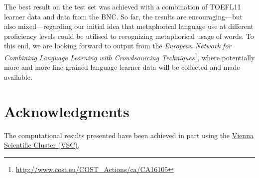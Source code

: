\documentclass[11pt,a4paper]{article}
\begin{document}
The best result on the test set was achieved with a combination of TOEFL11 learner data and data from the BNC. 
So far, the results are encouraging---but also mixed---regarding our initial idea that metaphorical language use at different proficiency levels could be utilised to recognizing metaphorical usage of words. 
To this end, we are looking forward to output from the \emph{European Network for Combining Language Learning with Crowdsourcing Techniques}\footnote{\url{http://www.cost.eu/COST_Actions/ca/CA16105}}, where potentially more and more fine-grained language learner data will be collected and made available.

\section*{Acknowledgments} %
The computational results presented have been achieved in part using the \href{http://vsc.ac.at}{Vienna
Scientific Cluster (VSC)}.

\medskip



\end{document}
